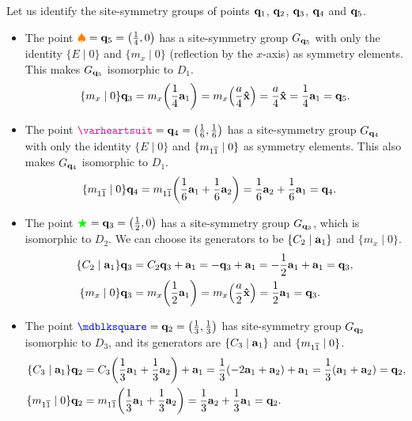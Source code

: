 \begin{example} \label{ex:site-symmetry_groups_p6mm}
Let us identify the site-symmetry groups of points ${\vb{q}}_1$, ${\vb{q}}_2$, ${\vb{q}}_3$, ${\vb{q}}_4$ and ${\vb{q}}_5$.

\begin{itemize}
\item The point $\textcolor{orange}{\spadesuit} = {\vb{q}}_5 = \qty(\frac{1}{4}, 0)$ has a site-symmetry group \(G_{{\vb{q}}_5}\) with only the identity $\{E \mid 0\}$ and $\{m_{x} \mid 0\}$ (reflection by the $x$-axis) as symmetry elements. This makes $G_{{\vb{q}}_5}$ isomorphic to $D_1$.
\begin{equation} \label{eq:site-symmetry-q5}
\{m_{x} \mid 0\} {\vb{q}}_3 = m_x \qty(\frac{1}{4} {\vb{a}}_1) = m_x \qty(\frac{a}{4} \vu{x}) = \frac{a}{4} \vu{x} = \frac{1}{4} {\vb{a}}_1 = {\vb{q}}_5.
\end{equation}


\item The point \(\textcolor{magenta}{\varheartsuit} = \q_4 = \qty(\frac{1}{6}, \frac{1}{6})\) has a site-symmetry group \(G_{{\vb{q}}_4}\) with only the identity $\{E \mid 0\}$ and $\{m_{1\overline{1}} \mid 0\}$ as symmetry elements. This also makes $G_{{\vb{q}}_4}$ isomorphic to $D_1$.
\begin{align} \label{eq:site-symmetry-q4}
\{m_{1\overline{1}} \mid 0\} {\vb{q}}_4 &= m_{1\overline{1}}\qty(\frac{1}{6} {\vb{a}}_1 + \frac{1}{6} {\vb{a}}_2) = \frac{1}{6} {\vb{a}}_2 + \frac{1}{6} {\vb{a}}_1 = {\vb{q}}_4.
\end{align}

\item The point \(\textcolor{green}{\bigstar} = {\vb{q}}_3 = \qty(\frac{1}{2}, 0)\) has a site-symmetry group \(G_{{\vb{q}}_3}\), which is isomorphic to \(D_2\). We can choose its generators to be $\{C_2 \mid {\vb{a}}_1\}$ and $\{m_{x}\mid 0\}$.
\begin{align} \label{eq:site-symmetry-q3}
\{C_2 \mid {\vb{a}}_1\} {\vb{q}}_3 &= C_2 {\vb{q}}_3 + {\vb{a}}_1 = -{\vb{q}}_3 + {\vb{a}}_1 = -\frac{1}{2} {\vb{a}}_1 + {\vb{a}}_1 = {\vb{q}}_3, \\
\{m_{x} \mid 0\} {\vb{q}}_3 &= m_x \qty(\frac{1}{2} {\vb{a}}_1) = m_x \qty(\frac{a}{2} \vu{x}) = \frac{1}{2} {\vb{a}}_1 = {\vb{q}}_3.
\end{align}

\item The point $\textcolor{blue}{\mdblksquare} = \q_2 = \qty(\frac{1}{3}, \frac{1}{3})$ has site-symmetry group $G_{{\vb{q}}_2}$ isomorphic to $D_3$, and its generators are $\{C_3 \mid {\vb{a}}_1\}$ and $\{m_{1\overline{1}} \mid 0\}$.
\begin{align} \label{eq:site-symmetry-q2}
\{C_3 \mid {\vb{a}}_1\} {\vb{q}}_2 &= C_3 \qty(\frac{1}{3} {\vb{a}}_1 + \frac{1}{3} {\vb{a}}_2) + {\vb{a}}_1 = \frac{1}{3} \qty(-2{\vb{a}}_1 + {\vb{a}}_2) + {\vb{a}}_1 =
\frac{1}{3} ({\vb{a}}_1 + {\vb{a}}_2) = {\vb{q}}_2, \\
\{m_{1\overline{1}} \mid 0\} {\vb{q}}_2 &= m_{1\overline{1}} \qty(\frac{1}{3} {\vb{a}}_1 + \frac{1}{3} {\vb{a}}_2) =
\frac{1}{3} {\vb{a}}_2 + \frac{1}{3} {\vb{a}}_1 = {\vb{q}}_2.
\end{align}


\end{itemize}
\end{example}
